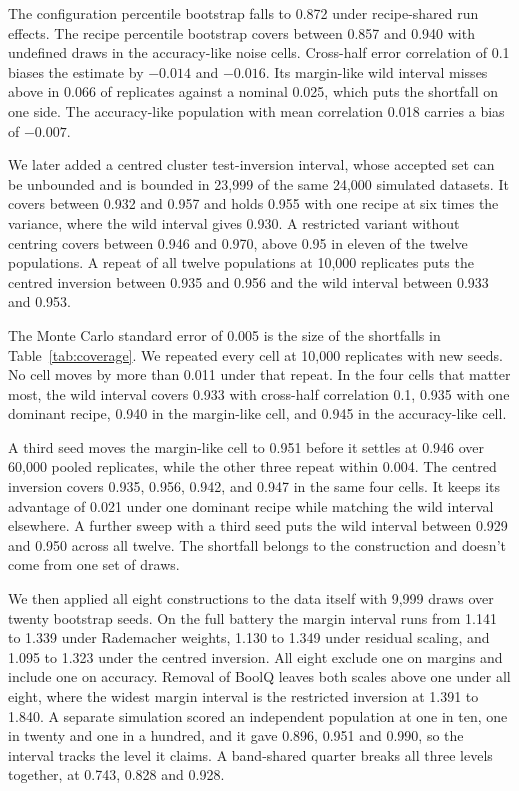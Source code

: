 The configuration percentile bootstrap falls to 0.872 under recipe-shared run effects. The recipe percentile bootstrap covers between 0.857 and 0.940 with undefined draws in the accuracy-like noise cells. Cross-half error correlation of 0.1 biases the estimate by $-0.014$ and $-0.016$. Its margin-like wild interval misses above in 0.066 of replicates against a nominal 0.025, which puts the shortfall on one side. The accuracy-like population with mean correlation 0.018 carries a bias of $-0.007$.

We later added a centred cluster test-inversion interval, whose accepted set can be unbounded and is bounded in 23,999 of the same 24,000 simulated datasets. It covers between 0.932 and 0.957 and holds 0.955 with one recipe at six times the variance, where the wild interval gives 0.930. A restricted variant without centring covers between 0.946 and 0.970, above 0.95 in eleven of the twelve populations. A repeat of all twelve populations at 10,000 replicates puts the centred inversion between 0.935 and 0.956 and the wild interval between 0.933 and 0.953.

The Monte Carlo standard error of 0.005 is the size of the shortfalls in Table~\ref{tab:coverage}. We repeated every cell at 10,000 replicates with new seeds. No cell moves by more than 0.011 under that repeat. In the four cells that matter most, the wild interval covers 0.933 with cross-half correlation 0.1, 0.935 with one dominant recipe, 0.940 in the margin-like cell, and 0.945 in the accuracy-like cell.

A third seed moves the margin-like cell to 0.951 before it settles at 0.946 over 60,000 pooled replicates, while the other three repeat within 0.004. The centred inversion covers 0.935, 0.956, 0.942, and 0.947 in the same four cells. It keeps its advantage of 0.021 under one dominant recipe while matching the wild interval elsewhere. A further sweep with a third seed puts the wild interval between 0.929 and 0.950 across all twelve. The shortfall belongs to the construction and doesn't come from one set of draws.

We then applied all eight constructions to the data itself with 9,999 draws over twenty bootstrap seeds. On the full battery the margin interval runs from 1.141 to 1.339 under Rademacher weights, 1.130 to 1.349 under residual scaling, and 1.095 to 1.323 under the centred inversion. All eight exclude one on margins and include one on accuracy. Removal of BoolQ leaves both scales above one under all eight, where the widest margin interval is the restricted inversion at 1.391 to 1.840. A separate simulation scored an independent population at one in ten, one in twenty and one in a hundred, and it gave 0.896, 0.951 and 0.990, so the interval tracks the level it claims. A band-shared quarter breaks all three levels together, at 0.743, 0.828 and 0.928.

